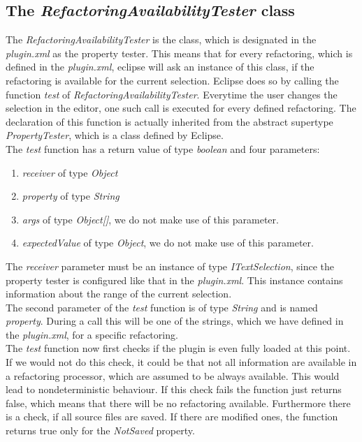 \documentclass[a4paper,10pt]{report}
\begin{document}
\subsection{The {\it RefactoringAvailabilityTester} class}
The {\it RefactoringAvailabilityTester} is the class, which is designated in the {\it plugin.xml} as the property tester. This means that for every refactoring, which is defined in the {\it plugin.xml},
eclipse will ask an instance of this class, if the refactoring is available for the current selection. Eclipse does so by calling the function {\it test} of {\it RefactoringAvailabilityTester}. 
Everytime the user changes the selection in the editor, one such call is executed for every defined refactoring.
The declaration of this function is actually inherited from the abstract supertype {\it PropertyTester}, which is a class defined by Eclipse.\\
The {\it test} function has a return value of type {\it boolean} and four parameters:
   \begin{enumerate}
     \item {\it receiver} of type {\it Object}
     \item {\it property} of type {\it String}
     \item {\it args}  of type {\it Object[]}, we do not make use of this parameter.
     \item {\it expectedValue}  of type {\it Object}, we do not make use of this parameter.
   \end{enumerate}
The {\it receiver} parameter must be an instance of type {\it ITextSelection}, since the property tester is configured like that in the {\it plugin.xml}. This instance contains information about the range of the current selection.\\
The second parameter of the {\it test} function is of type {\it String} and is named {\it property}. During a call this will be one of the strings, which we have defined in the {\it plugin.xml}, for a specific refactoring.\\
The {\it test} function now first checks if the plugin is even fully loaded at this point. If we would not do this check, it could be that not all information are available in a refactoring processor, which are assumed to be always available. This would lead to nondeterministic behaviour.
If this check fails the function just returns false, which means  that there will be no refactoring available. Furthermore there is a check, if all source files are saved. If there are modified ones, the function returns true only for the {\it NotSaved} property. 
\end{document}
